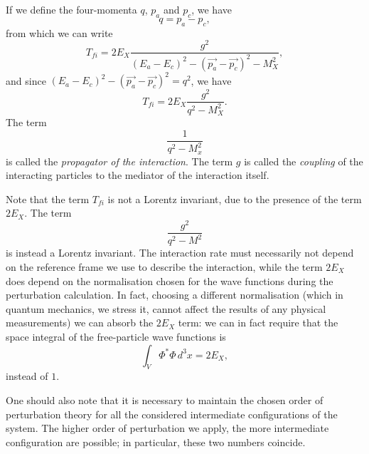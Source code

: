 If we define the four-momenta $q$, $p_a$ and $p_c$, we have
\[q = p_a - p_c,\]
from which we can write
\begin{equation*}
    T_{fi} = 2E_X \frac{g^2}{(E_a-E_c)^2 - (\Vec{p_a} - \Vec{p_c})^2 - M_X^2},
\end{equation*}
and since $(E_a-E_c)^2 - (\Vec{p_a} - \Vec{p_c})^2 = q^2$, we have
\begin{equation*}
    T_{fi} = 2E_X \frac{g^2}{q^2-M_X^2}.
\end{equation*}
The term
\begin{equation*}
    \frac{1}{q^2 - M_x^2}
\end{equation*}
is called the \emph{propagator of the interaction}.%
The term $g$ is called the \emph{coupling} of the interacting particles to the mediator of the interaction itself.

Note that the term $T_{fi}$ is not a Lorentz invariant, due to the presence of the term $2E_X$. The term
\begin{equation*}
    \frac{g^2}{q^2-M^2}
\end{equation*}
is instead a Lorentz invariant. The interaction rate must necessarily not depend on the reference frame we use to describe the interaction, while the term $2E_X$ does depend on the normalisation chosen for the wave functions during the perturbation calculation. In fact, choosing a different normalisation (which in quantum mechanics, we stress it, cannot affect the results of any physical measurements) we can absorb the $2E_X$ term: we can in fact require that the space integral of the free-particle wave functions is
\begin{equation*}
    \int_V \Phi^*\Phi\,d^3x = 2E_X,
\end{equation*}
instead of $1$.

One should also note that it is necessary to maintain the chosen order of perturbation theory for all the considered intermediate configurations of the system.
The higher order of perturbation we apply, the more intermediate configuration are possible; in particular, these two numbers coincide.

